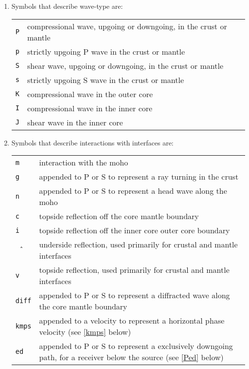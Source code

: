 \begin{enumerate}
\item Symbols that describe wave-type are:

\begin{tabular}{lp{5.0in}}
\texttt{P} & compressional wave, upgoing or downgoing, in the crust or mantle \\
\texttt{p} & strictly upgoing P wave in the crust or mantle \\
\texttt{S} & shear wave, upgoing or downgoing, in the crust or mantle \\
\texttt{s} & strictly upgoing S wave in the crust or mantle \\
\texttt{K} & compressional wave in the outer core \\
\texttt{I} & compressional wave in the inner core \\
\texttt{J} & shear wave in the inner core \\
\end{tabular}

\item Symbols that describe interactions with interfaces are:

\begin{tabular}{lp{5.0in}}
\texttt{m} & interaction with the moho \\
\texttt{g} & appended to P or S to represent a ray turning in the crust \\
\texttt{n} & appended to P or S to represent a head wave along the moho \\
\texttt{c} & topside reflection off the core mantle boundary \\
\texttt{i} & topside reflection off the inner core outer core boundary \\
\texttt{\^\,} & underside reflection, used primarily for crustal and mantle interfaces \\
\texttt{v} & topside reflection, used primarily for crustal and mantle interfaces \\
\texttt{diff} & appended to P or S to represent a diffracted wave along the core mantle boundary \\
\texttt{kmps} & appended to a velocity to represent a horizontal phase velocity (see
\ref{kmps} below)\\
\texttt{ed} & appended to P or S to represent a exclusively downgoing path, for a receiver below the source (see
\ref{Ped} below)\\
\end{tabular}


\end{enumerate}
